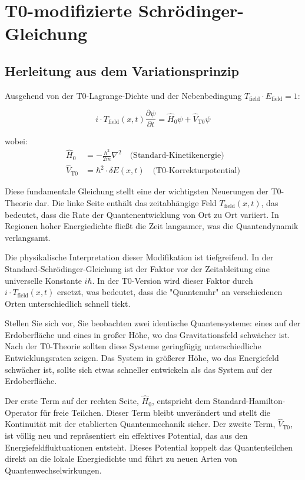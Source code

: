 \documentclass[12pt,a4paper]{article}
\newcommand{\deltaE}{\delta E}
\theoremstyle{definition}
\theoremstyle{remark}
\begin{document}
\section{T0-modifizierte Schrödinger-Gleichung}

\subsection{Herleitung aus dem Variationsprinzip}

Ausgehend von der T0-Lagrange-Dichte und der Nebenbedingung $T_{\text{field}} \cdot E_{\text{field}} = 1$:

\begin{equation}
	\boxed{i \cdot T_{\text{field}}(x,t) \frac{\partial\psi}{\partial t} = \hat{H}_0 \psi + \hat{V}_{\text{T0}} \psi}
	\label{eq:t0_schrodinger_general}
\end{equation}

wobei:
\begin{align}
	\hat{H}_0 &= -\frac{\hbar^2}{2m} \nabla^2 \quad \text{(Standard-Kinetikenergie)} \\
	\hat{V}_{\text{T0}} &= \hbar^2 \cdot \deltaE(x,t) \quad \text{(T0-Korrekturpotential)}
\end{align}

Diese fundamentale Gleichung stellt eine der wichtigsten Neuerungen der T0-Theorie dar. Die linke Seite enthält das zeitabhängige Feld $T_{\text{field}}(x,t)$, das bedeutet, dass die Rate der Quantenentwicklung von Ort zu Ort variiert. In Regionen hoher Energiedichte fließt die Zeit langsamer, was die Quantendynamik verlangsamt.

Die physikalische Interpretation dieser Modifikation ist tiefgreifend. In der Standard-Schrödinger-Gleichung ist der Faktor vor der Zeitableitung eine universelle Konstante $i\hbar$. In der T0-Version wird dieser Faktor durch $i \cdot T_{\text{field}}(x,t)$ ersetzt, was bedeutet, dass die "Quantenuhr" an verschiedenen Orten unterschiedlich schnell tickt.

Stellen Sie sich vor, Sie beobachten zwei identische Quantensysteme: eines auf der Erdoberfläche und eines in großer Höhe, wo das Gravitationsfeld schwächer ist. Nach der T0-Theorie sollten diese Systeme geringfügig unterschiedliche Entwicklungsraten zeigen. Das System in größerer Höhe, wo das Energiefeld schwächer ist, sollte sich etwas schneller entwickeln als das System auf der Erdoberfläche.

Der erste Term auf der rechten Seite, $\hat{H}_0$, entspricht dem Standard-Hamilton-Operator für freie Teilchen. Dieser Term bleibt unverändert und stellt die Kontinuität mit der etablierten Quantenmechanik sicher. Der zweite Term, $\hat{V}_{\text{T0}}$, ist völlig neu und repräsentiert ein effektives Potential, das aus den Energiefeldfluktuationen entsteht. Dieses Potential koppelt das Quantenteilchen direkt an die lokale Energiedichte und führt zu neuen Arten von Quantenwechselwirkungen.
\end{document}
